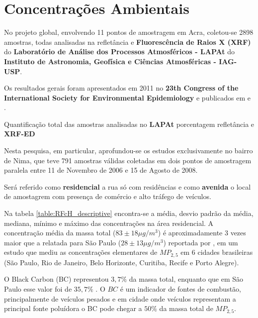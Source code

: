 \section{Concentrações Ambientais}

No projeto global, envolvendo 11 pontos de amostragem em Acra, 
coletou-se 2898 amostras, todas analisadas na refletância e 
\textbf{Fluorescência de Raios X (XRF)} do 
\textbf{Laboratório de Análise dos Processos Atmosféricos - LAPAt} 
do \textbf{Instituto de Astronomia, Geofísica e Ciências Atmosféricas - IAG-USP}.

Os resultados gerais foram apresentados em 2011 no
\textbf{23th Congress of the International Society for Environmental 
Epidemiology} \citep{zhou2011} e publicados em \cite{zhou2013} e \cite{zhou2014}. 

\begin{table}[H]
  \centering
  \begin{scriptsize}
  
  \end{scriptsize}
  \caption{Quantificação total das amostras analisadas no \textbf{LAPAt} porcentagem
          refletância e \textbf{XRF-ED}}
\end{table}

Nesta pesquisa, em particular, aprofundou-se os estudos exclusivamente no bairro de Nima, 
que teve 791 amostras válidas coletadas em dois pontos de amostragem paralela entre 11 de 
Novembro de 2006 e 15 de Agosto de 2008.

Será referido como \textbf{residencial} a rua só com residências e como \textbf{avenida} 
o local de amostagrem com presença de comércio e alto tráfego de veículos.

Na tabela \ref{table:RFcH_descriptive} encontra-se a média, desvio padrão da média, 
mediana, mínimo e máximo das concentrações na área residencial. 
A concentração média da massa total ($83\pm 18 \mu g / m^3$) é aproximadamente
3 vezes maior que a relatada para São Paulo ($28\pm 13 \mu g / m^3$) reportada 
por \cite{andrade2012}, em um estudo que mediu as concentrações elementares de 
$MP_{2,5}$ em 6 cidades brasileiras
(São Paulo, Rio de Janeiro, Belo Horizonte, Curitiba, Recife e Porto Alegre). 

O Black Carbon (BC) representou $3,7 \%$ da massa total, enquanto que em São Paulo
esse valor foi de $35,7 \%$ \citep{andrade2012}. 
O $BC$ é um indicador de fontes de combustão, principalmente de veículos pesados e 
em cidade onde veículos representam a principal fonte poluídora o BC pode chegar 
a $50\%$ da massa total de $MP_{2,5}$. 

